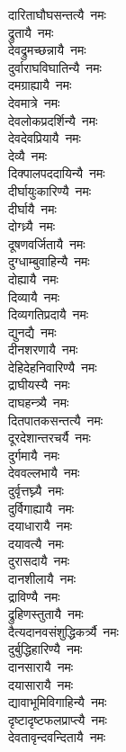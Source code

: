 \begin{multicols}{\maxColumns}
\begin{flushleft}
दारिताघौघसन्तत्यै~नमः\\
द्रुतायै~नमः\\
देवद्रुमच्छन्नायै~नमः\\
दुर्वाराघविघातिन्यै~नमः\\
दमग्राह्यायै~नमः\\
देवमात्रे~नमः\\
देवलोकप्रदर्शिन्यै~नमः\\
देवदेवप्रियायै~नमः\\
देव्यै~नमः\\
दिक्पालपददायिन्यै~नमः\hfill{}\\
दीर्घायुःकारिण्यै~नमः\\
दीर्घायै~नमः\\
दोग्ध्र्यै~नमः\\
दूषणवर्जितायै~नमः\\
दुग्धाम्बुवाहिन्यै~नमः\\
दोह्यायै~नमः\\
दिव्यायै~नमः\\
दिव्यगतिप्रदायै~नमः\\
द्युनद्यै~नमः\\
दीनशरणायै~नमः\hfill{}\\
देहिदेहनिवारिण्यै~नमः\\
द्राघीयस्यै~नमः\\
दाघहन्त्र्यै~नमः\\
दितपातकसन्तत्यै~नमः\\
दूरदेशान्तरचर्यै~नमः\\
दुर्गमायै~नमः\\
देववल्लभायै~नमः\\
दुर्वृत्तघ्न्यै~नमः\\
दुर्विगाह्यायै~नमः\\
दयाधारायै~नमः\hfill{}\\
दयावत्यै~नमः\\
दुरासदायै~नमः\\
दानशीलायै~नमः\\
द्राविण्यै~नमः\\
द्रुहिणस्तुतायै~नमः\\
दैत्यदानवसंशुद्धिकर्त्र्यै~नमः\\
दुर्बुद्धिहारिण्यै~नमः\\
दानसारायै~नमः\\
दयासारायै~नमः\\
द्यावाभूमिविगाहिन्यै~नमः\hfill{}\\
दृष्टादृष्टफलप्राप्त्यै~नमः\\
देवतावृन्दवन्दितायै~नमः\\

\end{flushleft}
\end{multicols}
